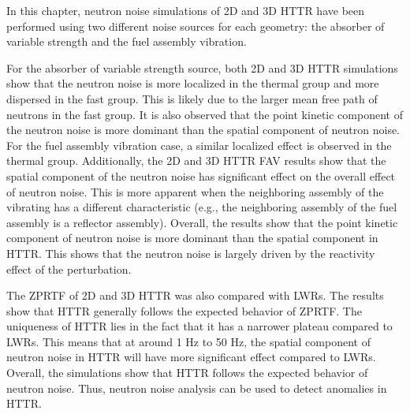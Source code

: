In this chapter, neutron noise simulations of 2D and 3D HTTR have been performed using two different noise sources for each geometry: the absorber of variable strength and the fuel assembly vibration.

For the absorber of variable strength source, both 2D and 3D HTTR simulations show that the neutron noise is more localized in the thermal group and more dispersed in the fast group. This is likely due to the larger mean free path of neutrons in the fast group. It is also observed that the point kinetic component of the neutron noise is more dominant than the spatial component of neutron noise. For the fuel assembly vibration case, a similar localized effect is observed in the thermal group. Additionally, the 2D and 3D HTTR FAV results show that the spatial component of the neutron noise has significant effect on the overall effect of neutron noise. This is more apparent when the neighboring assembly of the vibrating has a different characteristic (e.g., the neighboring assembly of the fuel assembly is a reflector assembly). Overall, the results show that the point kinetic component of neutron noise is more dominant than the spatial component in HTTR. This shows that the neutron noise is largely driven by the reactivity effect of the perturbation.

The ZPRTF of 2D and 3D HTTR was also compared with LWRs. The results show that HTTR generally follows the expected behavior of ZPRTF. The uniqueness of HTTR lies in the fact that it has a narrower plateau compared to LWRs. This means that at around 1 Hz to 50 Hz, the spatial component of neutron noise in HTTR will have more significant effect compared to LWRs. Overall, the simulations show that HTTR follows the expected behavior of neutron noise. Thus, neutron noise analysis can be used to detect anomalies in HTTR.